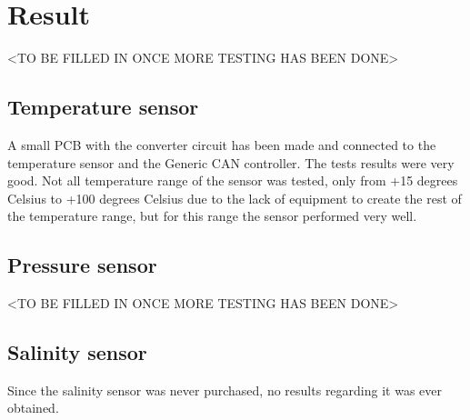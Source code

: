 
\section{Result}\label{sec:result}
<TO BE FILLED IN ONCE MORE TESTING HAS BEEN DONE>

\subsection{Temperature sensor}
A small PCB with the converter circuit has been made and connected to the temperature sensor and the Generic CAN controller. The tests results were very good. Not all temperature range of the sensor was tested, only from +15 degrees Celsius to +100 degrees Celsius due to the lack of equipment to create the rest of the temperature range, but for this range the sensor performed very well. 

\subsection{Pressure sensor}
<TO BE FILLED IN ONCE MORE TESTING HAS BEEN DONE>

\subsection{Salinity sensor}
Since the salinity sensor was never purchased, no results regarding it was ever obtained.

